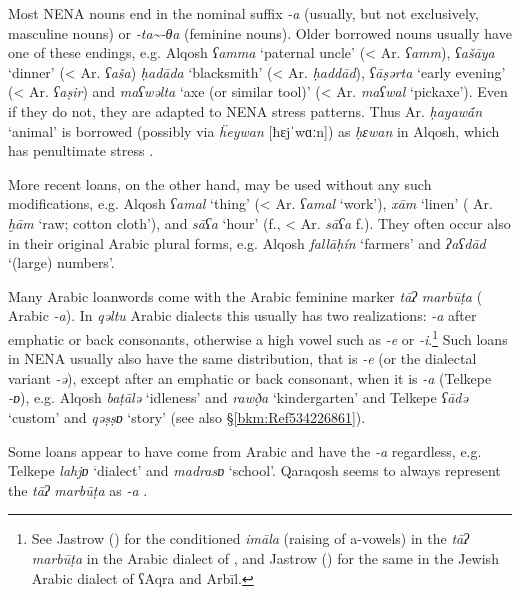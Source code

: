 \documentclass[output=paper]{langsci/langscibook}
\begin{document}
Most NENA nouns end in the nominal suffix \textit{{}-a} (usually, but not exclusively, masculine nouns) or \textit{{}-ta{\textasciitilde}-θa} (feminine nouns). Older borrowed nouns usually have one of these endings, e.g.  Alqosh \textit{ʕamma} ‘paternal uncle’ (< Ar. \textit{ʕamm}), \textit{ʕašāya} ‘dinner’ (<  Ar. \textit{ʕaša}) \textit{ḥadāda} ‘blacksmith’ (< Ar. \textit{ḥaddād}), \textit{ʕāṣərta} ‘early evening’ (<  Ar. \textit{ʕaṣir}) and \textit{maʕwəlta} ‘axe (or similar tool)’ (<  Ar. \textit{maʕwal} ‘pickaxe’). Even if they do not, they are adapted to NENA {stress} patterns. Thus Ar. \textit{ḥayaw\'{ā}n} ‘animal’ is borrowed (possibly via  \textit{ḧeywan} [ħɛjˈwɑːn]) as \textit{ḥɛwan} in  Alqosh, which has penultimate {stress} \citep[81]{Coghill2004}.

More recent loans, on the other hand, may be used without any such modifications, e.g.  Alqosh \textit{ʕamal} ‘thing’ (< Ar. \textit{ʕamal} ‘work’), \textit{xām} ‘linen’ ( Ar. \textit{ḫām} ‘raw; cotton cloth’), and \textit{sāʕa} ‘hour’ (f., < Ar. \textit{sāʕa} f.). They often occur also in their original Arabic plural forms, e.g.  Alqosh \textit{fallāḥín} ‘farmers’ and \textit{ʔaʕdād} ‘(large) numbers’. 

Many Arabic {loanwords} come with the Arabic feminine marker \textit{tāʔ} \textit{marbūṭa} ( Arabic \textit{\nobreakdash-a}). In \textit{qəltu} Arabic dialects this usually has two realizations: \textit{\nobreakdash-a} after {emphatic} or back consonants, otherwise a high vowel such as \textit{\nobreakdash-e} or \textit{\nobreakdash-i}.\footnote{See Jastrow (\citeyear[40]{Jastrow1979}) for the conditioned \textit{imāla} (raising of a-vowels) in the \textit{tāʔ} \textit{marbūṭa} in the Arabic dialect of , and Jastrow (\citeyear[70]{Jastrow1990book}) for the same in the Jewish Arabic dialect of ʕAqra and Arbīl.} Such loans in NENA usually also have the same distribution, that is \textit{{}-e} (or the dialectal variant \textit{-ə}), except after an {emphatic} or back consonant, when it is \textit{\nobreakdash-a} (Telkepe \textit{\nobreakdash-ɒ}), e.g.  Alqosh \textit{baṭālə} ‘idleness’ and \textit{rawð̣a} ‘kindergarten’ and  Telkepe \textit{ʕādə} ‘custom’ and \textit{qəṣṣɒ} ‘story’ (see also §\ref{bkm:Ref534226861}).

Some loans appear to have come from  Arabic and have the \textit{\nobreakdash-a} regardless, e.g.  Telkepe \textit{lahjɒ} ‘dialect’ and \textit{madrasɒ} ‘school’.  Qaraqosh seems to always represent the \textit{tāʔ} \textit{marbūṭa} as \textit{{}-a} \citep[204]{Khan2002}.
\end{document}
